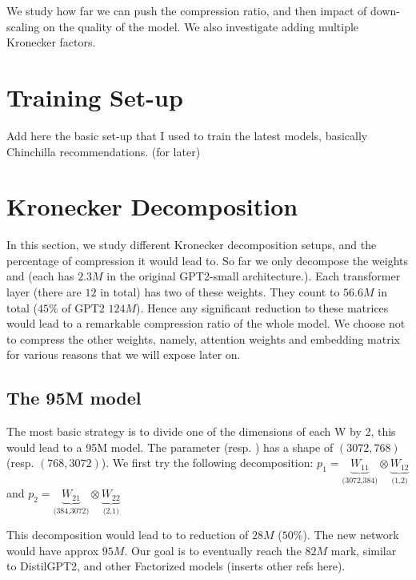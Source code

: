 \documentclass{article}
\begin{document}
We study how far we can push the compression ratio, and then impact of down-scaling on the quality of the model. We also investigate adding multiple Kronecker factors.


\section{Training Set-up}%
\label{sec:Training setups}

Add here the basic set-up that I used to train the latest models, basically Chinchilla recommendations. (for later)

\section{Kronecker Decomposition}%
\label{sub:Kronecker Decomposition}

In this section, we study different Kronecker decomposition setups, and the percentage of compression it would  lead to. So far we only decompose the weights  and  (each has $2.3M$ in the original GPT2-small architecture.). Each transformer layer (there are $12$ in total) has two of these weights. They count to $56.6M$ in total ($45\%$ of GPT2 $124M$). Hence any significant reduction to these matrices would lead to a remarkable compression ratio of the whole model. We choose not to compress the other weights, namely, attention weights and embedding matrix for various reasons that we will expose later on. 

\subsection{The 95M model}%
\label{sub:The 95M model}
The most basic strategy is to divide one of the dimensions of each W by 2, this would lead to a 95M model. The parameter  (resp. ) has a shape of $(3072, 768)$ (resp.  $(768, 3072)$). We first try the following decomposition: $p_1 = \underbrace{W_{11}}_{\text{(3072,384)}} \otimes \underbrace{W_{12}}_{\text{(1,2)}}$  and $p_2 = \underbrace{W_{21}}_{\text{(384,3072)}} \otimes \underbrace{W_{22}}_{\text{(2,1)}}$  


This decomposition would lead to to reduction of $28M$ ($50\%$). The new network would have approx $95M$. Our goal is to eventually reach the $82M$ mark, similar to DistilGPT2, and other Factorized models (inserts other refs here).
\end{document}
